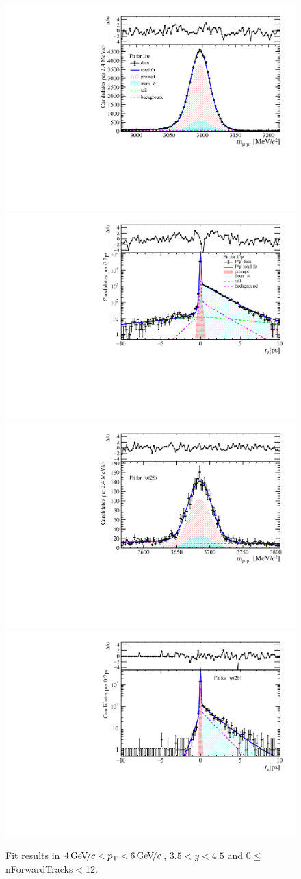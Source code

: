 \begin{figure}[H]
\begin{center}
\includegraphics[width=0.47\linewidth]{pdf/Jpsi/drawmassF/n1y3pt3.pdf}
\includegraphics[width=0.47\linewidth]{pdf/Jpsi/2DFitF/n1y3pt3.pdf}
\vspace*{-0.5cm}
\includegraphics[width=0.47\linewidth]{pdf/Psi2S/drawmassF/n1y3pt3.pdf}
\includegraphics[width=0.47\linewidth]{pdf/Psi2S/2DFitF/n1y3pt3.pdf}
\vspace*{-0.5cm}
\end{center}
\caption{Fit results in $4\text{\,Ge\kern -0.1em V\!/}c<p_{\mathrm{T}}<6\text{\,Ge\kern -0.1em V\!/}c$, $3.5<y<4.5$ and 0$\leq$nForwardTracks$<$12.}
\label{Fitn1y3pt3}
\end{figure}
